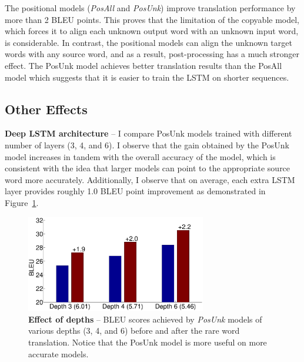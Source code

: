 The positional models ({\it PosAll} and {\it PosUnk}) 
improve translation performance by more than 2 BLEU points. 
This proves that the limitation of the copyable model, which forces
it to align each unknown output word with an unknown input word, is considerable.  
In contrast, the positional models can align the unknown target words with any source word,
and as a result, post-processing has a much stronger effect. 
The PosUnk model achieves better translation results than
the PosAll model which suggests that it is easier to train the LSTM on shorter sequences. 

\subsection{Other Effects}
\label{subsec:effects}
{\bf Deep LSTM architecture} --  I compare PosUnk models trained with different number of layers (3, 4, and 6). 
I observe that the gain obtained by the PosUnk model increases in tandem with the overall accuracy of the model, which is consistent 
with the idea that larger models can point to the appropriate source word more accurately.
Additionally, I observe that on average, each extra LSTM layer provides roughly 1.0 BLEU point improvement as demonstrated in Figure~\ref{f:depth}. 

\begin{figure}[tbh!]
\centering
\includegraphics[width=0.7\textwidth, clip=true, trim= 0 0 0 0]{img/3-depth} %
\caption[Effect of depths]{{\bf Effect of depths} -- BLEU scores achieved by {\it PosUnk} models of various depths (3, 4, and 6) before and after the rare word translation. 
 Notice that the PosUnk model is more useful on more accurate models. }
\label{f:depth}
\end{figure}


